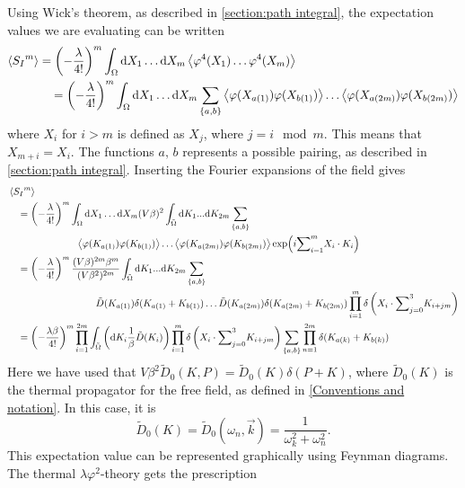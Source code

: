 Using Wick's theorem, as described in \autoref{section:path integral}, the expectation values we are evaluating can be written
\begin{align*}
    \ex{{S_I}^m} & 
    = \left(- \frac{\lambda }{4!}\right)^m 
    \int_{\Omega} \dd X_1 \dots \dd X_m
    \ex{\varphi^4(X_1) \dots \varphi^4(X_m)} \\ 
    & \quad
    = \left(- \frac{\lambda }{4!}\right)^m 
    \int_{\Omega} \dd X_1 \dots \dd X_m \sum_{\{a, b\}}
    \ex{\varphi(X_{a(1)}) \varphi(X_{b(1)})} 
    \dots
    \ex{\varphi(X_{a(2m)}) \varphi(X_{b(2m)})}
\end{align*}
where $X_i$ for $i>m$ is defined as $X_j$, where $j = i \mod m$.
This means that $X_{m + i} = X_i$.
The functions $a,\,b$ represents a possible pairing, as described in \autoref{section:path integral}.
Inserting the Fourier expansions of the field gives
\begin{align*}
    & \ex{{S_I}^m} \\ 
    &\quad 
    = \left(-\frac{\lambda }{4!}\right)^m 
    \int_{\Omega} \dd X_1 \dots \dd X_m
    (V \beta)^2 \int_{\tilde \Omega} \dd K_1 ... \dd K_{2m} \sum_{\{a, b\}} \\
    & \quad \quad \quad \quad\quad \quad \quad
    \ex{\varphi(K_{a(1)}) \varphi(K_{b(1)})} 
    \dots
    \ex{\varphi(K_{a(2m)}) \varphi(K_{b(2m)})}     
    \exp(i {\sum}_{i=1}^{m} X_i \cdot K_i)\\ 
    & \quad  
    = \left(-\frac{\lambda }{4!}\right)^m 
    \frac{(V \beta)^{2m} \beta^m}{(V \beta^2)^{2m}}
    \int_{\tilde \Omega} \dd K_1 ... \dd K_{2m} \sum_{\{a, b\}} \\
    & \quad \quad \quad \quad \quad \quad \quad \quad \quad
    \tilde D(K_{a(1)}) \delta(K_{a(1)} + K_{b(1)}) \dots 
    \tilde D(K_{a(2m)}) \delta(K_{a(2m)} + K_{b(2m)})
    \prod_{i=1}^m \delta\left(X_i \cdot {\sum}_{j=0}^3 K_{i + jm}\right) \\
    & \quad 
    = \left(-\frac{\lambda \beta}{4!}\right)^m 
    \prod_{i=1}^{2m} \int_{\tilde \Omega} 
    \left( \dd K_i \frac{1}{\beta} \tilde D(K_i)  \right) 
    \prod_{i=1}^m \delta\left(X_i \cdot {\sum}_{j=0}^3 K_{i + jm}\right)
    \sum_{\{a, b\}} 
    \prod_{n=1}^{2m}\delta(K_{a(k)} + K_{b(k)})
\end{align*}
Here we have used that $V \beta^2 \tilde D_0(K, P) = \tilde D_0(K) \delta(P + K)$, where $\tilde D_0(K)$ is the thermal propagator for the free field, as defined in \autoref{Conventions and notation}.
In this case, it is
\begin{equation}
    \tilde D_0(K) = \tilde D_0(\omega_n, \vec k) = \frac{1}{\omega_k^2 + \omega_n^2}.
\end{equation}
This expectation value can be represented graphically using Feynman diagrams.
The thermal $\lambda \varphi^2$-theory gets the prescription


